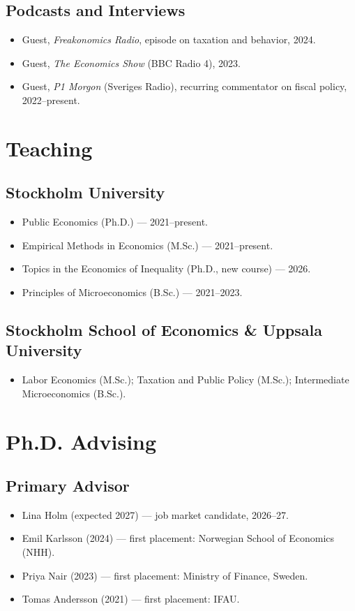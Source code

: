 \documentclass[11pt]{article}
\newcommand{\NEW}[1]{\textcolor{newgreen}{#1}}%
\newcommand{\NEW}[1]{#1}%
\begin{document}
\subsection{Podcasts and Interviews}
\begin{itemize}
\item Guest, \emph{Freakonomics Radio}, episode on taxation and behavior, 2024.
\item Guest, \emph{The Economics Show} (BBC Radio 4), 2023.
\item Guest, \emph{P1 Morgon} (Sveriges Radio), recurring commentator on fiscal policy, 2022--present.
\end{itemize}

\section{Teaching}
\subsection{Stockholm University}
\begin{itemize}
\item Public Economics (Ph.D.) --- 2021--present.
\item Empirical Methods in Economics (M.Sc.) --- 2021--present.
\item \NEW{Topics in the Economics of Inequality (Ph.D., new course) --- 2026.}
\item Principles of Microeconomics (B.Sc.) --- 2021--2023.
\end{itemize}
\subsection{Stockholm School of Economics \& Uppsala University}
\begin{itemize}
\item Labor Economics (M.Sc.); Taxation and Public Policy (M.Sc.); Intermediate Microeconomics (B.Sc.).
\end{itemize}

\section{Ph.D. Advising}
\subsection{Primary Advisor}
\begin{itemize}
\item \NEW{Lina Holm (expected 2027) --- job market candidate, 2026--27.}
\item Emil Karlsson (2024) --- first placement: Norwegian School of Economics (NHH).
\item Priya Nair (2023) --- first placement: Ministry of Finance, Sweden.
\item Tomas Andersson (2021) --- first placement: IFAU.
\end{itemize}
\end{document}
